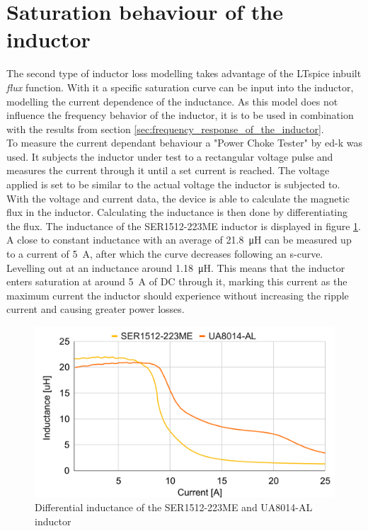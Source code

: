 \section{Saturation behaviour of the inductor}\label{sec:saturation_behaviour_of_the_inductor}
The second type of inductor loss modelling takes advantage of the LTspice inbuilt \textit{flux} function. With it a  specific saturation curve can be input into the inductor, modelling the current dependence of the inductance. As this model does not influence the frequency behavior of the inductor, it is to be used in combination with the results from section \ref{sec:frequency_response_of_the_inductor}. \\
To measure the current dependant behaviour a "Power Choke Tester" by ed-k was used. It subjects the inductor under test to a rectangular voltage pulse and measures the current through it until a set current is reached. The voltage applied is set to be similar to the actual voltage the inductor is subjected to. With the voltage and current data, the device is able to calculate the magnetic flux in the inductor. Calculating the inductance is then done by differentiating the flux. The inductance of the SER1512-223ME inductor is displayed in figure \ref{fig:differential_inductance_of_the_ser1512-223me_inductor}. A close to constant inductance with an average of \SI{21.8}{\micro\henry} can be measured up to a current of \SI{5}{\A}, after which the curve decreases following an s-curve. Levelling out at an inductance around \SI{1.18}{\micro\henry}. This means that the inductor enters saturation at around \SI{5}{\A} of \ac{DC} through it, marking this current as the maximum current the inductor should experience without increasing the ripple current and causing greater power losses. 
\begin{figure}[H]
    \centering
    \includegraphics[width=0.75\linewidth]{Bilder//Kapitel3/SER223_UA_Saturation.pdf}
    \caption{Differential inductance of the SER1512-223ME and UA8014-AL inductor}
    \label{fig:differential_inductance_of_the_ser1512-223me_inductor}
\end{figure}
